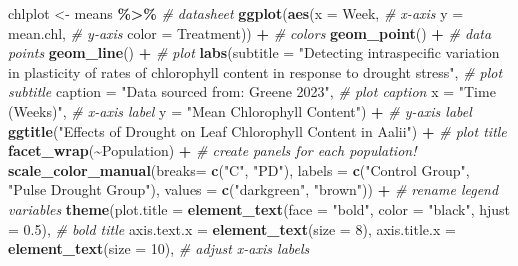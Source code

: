 \documentclass[
]{article}
\newenvironment{Shaded}{\begin{snugshade}}{\end{snugshade}}
\newcommand{\AttributeTok}[1]{\textcolor[rgb]{0.13,0.29,0.53}{#1}}
\newcommand{\CommentTok}[1]{\textcolor[rgb]{0.56,0.35,0.01}{\textit{#1}}}
\newcommand{\DecValTok}[1]{\textcolor[rgb]{0.00,0.00,0.81}{#1}}
\newcommand{\FloatTok}[1]{\textcolor[rgb]{0.00,0.00,0.81}{#1}}
\newcommand{\FunctionTok}[1]{\textcolor[rgb]{0.13,0.29,0.53}{\textbf{#1}}}
\newcommand{\NormalTok}[1]{#1}
\newcommand{\OtherTok}[1]{\textcolor[rgb]{0.56,0.35,0.01}{#1}}
\newcommand{\SpecialCharTok}[1]{\textcolor[rgb]{0.81,0.36,0.00}{\textbf{#1}}}
\newcommand{\StringTok}[1]{\textcolor[rgb]{0.31,0.60,0.02}{#1}}
\begin{document}
\begin{Shaded}
\begin{Highlighting}[]
\NormalTok{chlplot }\OtherTok{\textless{}{-}}\NormalTok{ means }\SpecialCharTok{\%\textgreater{}\%} \CommentTok{\# datasheet}
  \FunctionTok{ggplot}\NormalTok{(}\FunctionTok{aes}\NormalTok{(}\AttributeTok{x =}\NormalTok{ Week, }\CommentTok{\# x{-}axis}
             \AttributeTok{y =}\NormalTok{ mean.chl, }\CommentTok{\# y{-}axis}
             \AttributeTok{color =}\NormalTok{ Treatment)) }\SpecialCharTok{+} \CommentTok{\# colors}
  \FunctionTok{geom\_point}\NormalTok{() }\SpecialCharTok{+}  \CommentTok{\# data points}
  \FunctionTok{geom\_line}\NormalTok{() }\SpecialCharTok{+}  \CommentTok{\# plot}
  \FunctionTok{labs}\NormalTok{(}\AttributeTok{subtitle =} \StringTok{"Detecting intraspecific variation in plasticity of rates of chlorophyll content in response to drought stress"}\NormalTok{, }\CommentTok{\# plot subtitle}
       \AttributeTok{caption =} \StringTok{"Data sourced from: Greene 2023"}\NormalTok{, }\CommentTok{\# plot caption}
       \AttributeTok{x =} \StringTok{"Time (Weeks)"}\NormalTok{, }\CommentTok{\# x{-}axis label}
       \AttributeTok{y =} \StringTok{"Mean Chlorophyll Content"}\NormalTok{) }\SpecialCharTok{+} \CommentTok{\# y{-}axis label}
  \FunctionTok{ggtitle}\NormalTok{(}\StringTok{"Effects of Drought on Leaf Chlorophyll Content in \textquotesingle{}A\textquotesingle{}ali\textquotesingle{}i"}\NormalTok{) }\SpecialCharTok{+} \CommentTok{\# plot title}
  \FunctionTok{facet\_wrap}\NormalTok{(}\SpecialCharTok{\textasciitilde{}}\NormalTok{Population) }\SpecialCharTok{+} \CommentTok{\# create panels for each population!}
  \FunctionTok{scale\_color\_manual}\NormalTok{(}\AttributeTok{breaks=} \FunctionTok{c}\NormalTok{(}\StringTok{"C"}\NormalTok{, }\StringTok{"PD"}\NormalTok{), }\AttributeTok{labels =} \FunctionTok{c}\NormalTok{(}\StringTok{"Control Group"}\NormalTok{, }\StringTok{"Pulse Drought Group"}\NormalTok{), }\AttributeTok{values =} \FunctionTok{c}\NormalTok{(}\StringTok{"darkgreen"}\NormalTok{, }\StringTok{"brown"}\NormalTok{)) }\SpecialCharTok{+} \CommentTok{\# rename legend variables}
  \FunctionTok{theme}\NormalTok{(}\AttributeTok{plot.title =} \FunctionTok{element\_text}\NormalTok{(}\AttributeTok{face =} \StringTok{"bold"}\NormalTok{, }\AttributeTok{color =} \StringTok{"black"}\NormalTok{, }\AttributeTok{hjust =} \FloatTok{0.5}\NormalTok{), }\CommentTok{\# bold title}
        \AttributeTok{axis.text.x =} \FunctionTok{element\_text}\NormalTok{(}\AttributeTok{size =} \DecValTok{8}\NormalTok{), }\AttributeTok{axis.title.x =} \FunctionTok{element\_text}\NormalTok{(}\AttributeTok{size =} \DecValTok{10}\NormalTok{), }\CommentTok{\# adjust x{-}axis labels}

\end{Highlighting}
\end{Shaded}
\end{document}
